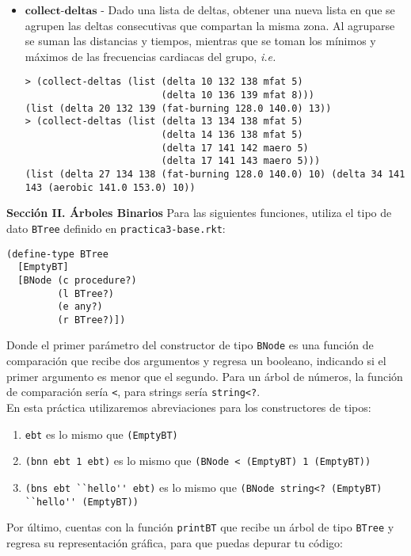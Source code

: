\documentclass{article}
\begin{document}
\begin{itemize}
\item $\textbf{collect-deltas}$ - Dado una lista de deltas, obtener una nueva lista en que se agrupen las deltas consecutivas que compartan la misma zona. Al agruparse se suman las distancias y tiempos, mientras que se toman los mínimos y máximos de las frecuencias cardiacas del grupo, \textit{i.e.}
\begin{verbatim}
> (collect-deltas (list (delta 10 132 138 mfat 5) 
                        (delta 10 136 139 mfat 8)))
(list (delta 20 132 139 (fat-burning 128.0 140.0) 13))
> (collect-deltas (list (delta 13 134 138 mfat 5) 
                        (delta 14 136 138 mfat 5)
                        (delta 17 141 142 maero 5)
                        (delta 17 141 143 maero 5)))
(list (delta 27 134 138 (fat-burning 128.0 140.0) 10) (delta 34 141 143 (aerobic 141.0 153.0) 10))
\end{verbatim}
\end{itemize}

\textbf{Sección II. Árboles Binarios}
Para las siguientes funciones, utiliza el tipo de dato \verb;BTree;
definido en \verb;practica3-base.rkt;:
\begin{verbatim}
(define-type BTree
  [EmptyBT]
  [BNode (c procedure?)
         (l BTree?)
         (e any?)
         (r BTree?)])
\end{verbatim}

Donde el primer parámetro del constructor de tipo \verb;BNode; es una función de comparación que recibe dos argumentos y regresa un booleano, indicando si el primer argumento es menor que el segundo. Para un árbol de números, la función de comparación sería \verb;<;, para strings sería \verb;string<?;. \\
    
En esta práctica utilizaremos abreviaciones para los constructores de tipos:

\begin{enumerate}
\item \verb;ebt; es lo mismo que \verb;(EmptyBT);
\item \verb;(bnn ebt 1 ebt); es lo mismo que \verb;(BNode < (EmptyBT) 1 (EmptyBT));
\item \verb;(bns ebt ``hello'' ebt); es lo mismo que \verb;(BNode string<? (EmptyBT) ``hello'' (EmptyBT));
\end{enumerate}

Por último, cuentas con la función \verb;printBT; que recibe un árbol de tipo \verb;BTree; y regresa su representación gráfica, para que puedas depurar tu código: \\
\end{document}
